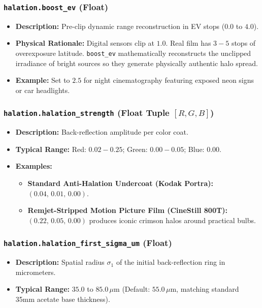 \documentclass[11pt,a4paper]{article}
\begin{document}
\subsubsection{\texttt{halation.boost\_ev} (Float)}
\begin{itemize}[leftmargin=*]
    \item \textbf{Description:} Pre-clip dynamic range reconstruction in EV stops ($0.0$ to $4.0$).
    \item \textbf{Physical Rationale:} Digital sensors clip at $1.0$. Real film has $3-5$ stops of overexposure latitude. \texttt{boost\_ev} mathematically reconstructs the unclipped irradiance of bright sources so they generate physically authentic halo spread.
    \item \textbf{Example:} Set to $2.5$ for night cinematography featuring exposed neon signs or car headlights.
\end{itemize}

\subsubsection{\texttt{halation.halation\_strength} (Float Tuple $[R, G, B]$)}
\begin{itemize}[leftmargin=*]
    \item \textbf{Description:} Back-reflection amplitude per color coat.
    \item \textbf{Typical Range:} Red: $0.02 - 0.25$; Green: $0.00 - 0.05$; Blue: $0.00$.
    \item \textbf{Examples:}
    \begin{itemize}
        \item \textbf{Standard Anti-Halation Undercoat (Kodak Portra):} $(0.04,\, 0.01,\, 0.00)$.
        \item \textbf{Remjet-Stripped Motion Picture Film (CineStill 800T):} $(0.22,\, 0.05,\, 0.00)$ produces iconic crimson halos around practical bulbs.
    \end{itemize}
\end{itemize}

\subsubsection{\texttt{halation.halation\_first\_sigma\_um} (Float)}
\begin{itemize}[leftmargin=*]
    \item \textbf{Description:} Spatial radius $\sigma_1$ of the initial back-reflection ring in micrometers.
    \item \textbf{Typical Range:} $35.0$ to $85.0\,\mu\text{m}$ (Default: $55.0\,\mu\text{m}$, matching standard 35mm acetate base thickness).
\end{itemize}
\end{document}
